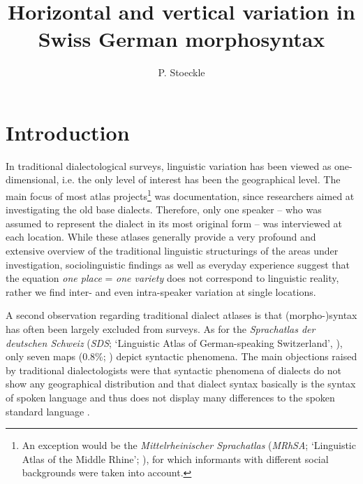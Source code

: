\documentclass[output=paper]{LSP/langsci}
\author{P. Stoeckle\affiliation{?}}
\title{Horizontal and vertical variation in Swiss German morphosyntax}
\begin{document}
 
   

\section{Introduction}
In traditional dialectological surveys, linguistic variation has been viewed as one-dimensional, i.e. the only level of interest has been the geographical level. The main focus of most atlas projects\footnote{ An exception would be the \emph{Mittelrheinischer Sprachatlas} (\emph{MRhSA}; ‘Linguistic Atlas of the Middle Rhine’; \citealt{bellmann_mittelrheinischer_1994}), for which informants with different social backgrounds were taken into account.} was documentation, since researchers aimed at investigating the old base dialects. Therefore, only one speaker – who was assumed to represent the dialect in its most original form – was interviewed at each location. While these atlases generally provide a very profound and extensive overview of the traditional linguistic structurings of the areas under investigation, sociolinguistic findings as well as everyday experience suggest that the equation \emph{one place} = \emph{one variety} does not correspond to linguistic reality, rather we find inter- and even intra-speaker variation at single locations.

A second observation regarding traditional dialect atlases is that (morpho-)syntax has often been largely excluded from surveys. As for the \emph{Sprachatlas der deutschen Schweiz} (\emph{SDS}; ‘Linguistic Atlas of German-speaking Switzerland’, \cite{hotzenkocherle_sprachatlas_1962}), only seven maps (0.8\%; \citealt[42]{bucheli_syntactic_2002}) depict syntactic phenomena. The main objections raised by traditional dialectologists were that syntactic phenomena of dialects do not show any geographical distribution and that dialect syntax basically is the syntax of spoken language and thus does not display many differences to the spoken standard language \citep[109]{loffler_dialektologie._2003}.
\end{document}
